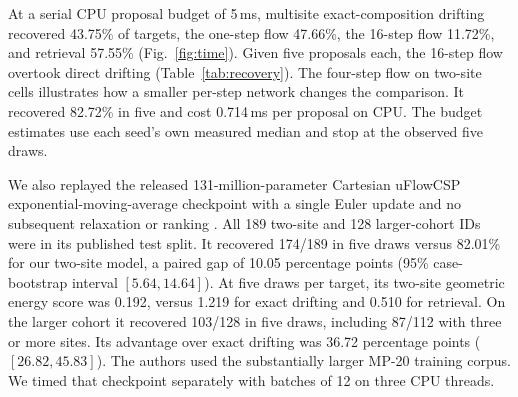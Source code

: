 At a serial CPU proposal budget of 5\,ms, multisite exact-composition drifting recovered 43.75\% of targets, the one-step flow 47.66\%, the 16-step flow 11.72\%, and retrieval 57.55\% (Fig.~\ref{fig:time}). Given five proposals each, the 16-step flow overtook direct drifting (Table~\ref{tab:recovery}). The four-step flow on two-site cells illustrates how a smaller per-step network changes the comparison. It recovered 82.72\% in five and cost 0.714\,ms per proposal on CPU. The budget estimates use each seed's own measured median and stop at the observed five draws.

We also replayed the released 131-million-parameter Cartesian uFlowCSP exponential-moving-average checkpoint with a single Euler update and no subsequent relaxation or ranking \cite{uflow}. All 189 two-site and 128 larger-cohort IDs were in its published test split. It recovered 174/189 in five draws versus 82.01\% for our two-site model, a paired gap of 10.05 percentage points (95\% case-bootstrap interval $[5.64,14.64]$). At five draws per target, its two-site geometric energy score was 0.192, versus 1.219 for exact drifting and 0.510 for retrieval. On the larger cohort it recovered 103/128 in five draws, including 87/112 with three or more sites. Its advantage over exact drifting was 36.72 percentage points ($[26.82,45.83]$). The authors used the substantially larger MP-20 training corpus. We timed that checkpoint separately with batches of 12 on three CPU threads.
